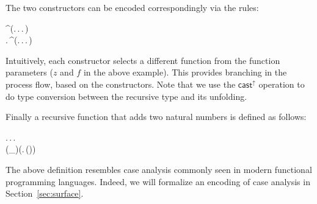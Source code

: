 The two constructors can be encoded correspondingly via the \cast rules:
\begin{hscode}\SaveRestoreHook
{}%
%
%
\>[3]{}\mathrel{=}^\uparrow{}\;(\lambda {}\mathbin{:}\star.\,\lambda {}\mathbin{:}.\,\lambda {}\mathbin{:}\to {}.\,){}\<[E]%
\\
\>[3]{}\mathrel{=}\lambda {}\mathbin{:}.\,^\uparrow{}\;(\lambda {}\mathbin{:}\star.\,\lambda {}\mathbin{:}.\,\lambda {}\mathbin{:}\to {}.\,\;){}\<[E]%
\ColumnHook
\end{hscode}\resethooks
{}
Intuitively, each constructor selects a different function from the
function parameters ($z$ and $f$ in the above example). This provides
branching in the process flow, based on the constructors. Note that we
use the $ \mathsf{cast}^{\uparrow} $ operation to do type conversion between the
recursive type and its unfolding.

Finally a recursive function that adds two natural numbers is defined
as follows:
\begin{hscode}\SaveRestoreHook
{}%
%
%
%
\>[3]{}\mu\;\mathbin{:}\to {}\to {}.\,\lambda {}\mathbin{:}.\,\lambda {}\mathbin{:}.\,{}\<[E]%
\\
\>[3]{}\<[7]%
\>[7]{}(_\downarrow\;)\;\;\;(\lambda {}\mathbin{:}.\,\;(\;\;)){}\<[E]%
\ColumnHook
\end{hscode}\resethooks
The above definition resembles case analysis commonly seen in
modern functional programming languages.
Indeed, we will formalize an encoding of 
case analysis in Section~\ref{sec:surface}.



